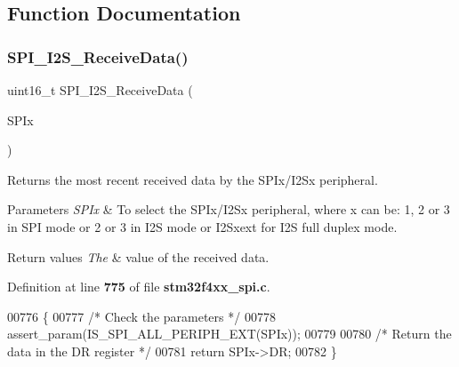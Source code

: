 \subsection{Function Documentation}
\mbox{\label{group__SPI__Group2_gab77de76547f3bff403236b263b070a30}} 
\subsubsection{S\+P\+I\+\_\+\+I2\+S\+\_\+\+Receive\+Data()}
{\footnotesize\ttfamily uint16\+\_\+t S\+P\+I\+\_\+\+I2\+S\+\_\+\+Receive\+Data (\begin{DoxyParamCaption}\item[{\textbf{ S\+P\+I\+\_\+\+Type\+Def} $\ast$}]{S\+P\+Ix }\end{DoxyParamCaption})}



Returns the most recent received data by the S\+P\+Ix/\+I2\+Sx peripheral. 


\begin{DoxyParams}{Parameters}
{\em S\+P\+Ix} & To select the S\+P\+Ix/\+I2\+Sx peripheral, where x can be\+: 1, 2 or 3 in S\+PI mode or 2 or 3 in I2S mode or I2\+Sxext for I2S full duplex mode. \\
\hline
\end{DoxyParams}

\begin{DoxyRetVals}{Return values}
{\em The} & value of the received data. \\
\hline
\end{DoxyRetVals}


Definition at line \textbf{ 775} of file \textbf{ stm32f4xx\+\_\+spi.\+c}.


\begin{DoxyCode}
00776 \{
00777   \textcolor{comment}{/* Check the parameters */}
00778   assert_param(IS_SPI_ALL_PERIPH_EXT(SPIx));
00779   
00780   \textcolor{comment}{/* Return the data in the DR register */}
00781   \textcolor{keywordflow}{return} SPIx->DR;
00782 \}
\end{DoxyCode}
\mbox{\label{group__SPI__Group2_gad5af40bebe8dbe3fa8bd476489d7e3da}} 

